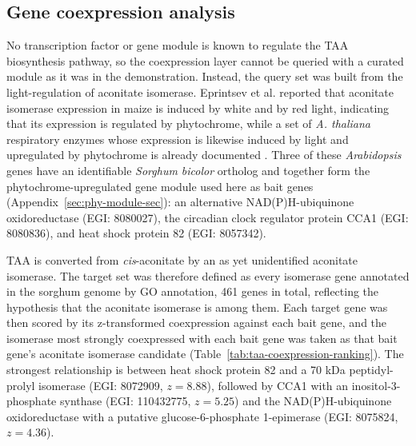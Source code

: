\subsection{Gene coexpression analysis}
\hspace{1em}No transcription factor or gene module is known to regulate the TAA biosynthesis pathway, so the coexpression layer cannot be queried with a curated module as it was in the demonstration. Instead, the query set was built from the light-regulation of aconitate isomerase. Eprintsev et al. \cite{eprintsevAconitateIsomeraseMaize2021} reported that aconitate isomerase expression in maize is induced by white and by red light, indicating that its expression is regulated by phytochrome, while a set of \textit{A. thaliana} respiratory enzymes whose expression is likewise induced by light and upregulated by phytochrome is already documented \cite{igamberdievMitochondriaPhotosyntheticCells2023}. Three of these \textit{Arabidopsis} genes have an identifiable \textit{Sorghum bicolor} ortholog and together form the phytochrome-upregulated gene module used here as bait genes (Appendix~\ref{sec:phy-module-sec}): an alternative NAD(P)H-ubiquinone oxidoreductase (EGI: 8080027), the circadian clock regulator protein CCA1 (EGI: 8080836), and heat shock protein 82 (EGI: 8057342).

\hspace{1em}TAA is converted from \textit{cis}-aconitate by an as yet unidentified aconitate isomerase. The target set was therefore defined as every isomerase gene annotated in the sorghum genome by GO annotation, 461 genes in total, reflecting the hypothesis that the aconitate isomerase is among them. Each target gene was then scored by its z-transformed coexpression against each bait gene, and the isomerase most strongly coexpressed with each bait gene was taken as that bait gene's aconitate isomerase candidate (Table~\ref{tab:taa-coexpression-ranking}). The strongest relationship is between heat shock protein 82 and a 70 kDa peptidyl-prolyl isomerase (EGI: 8072909, $z = 8.88$), followed by CCA1 with an inositol-3-phosphate synthase (EGI: 110432775, $z = 5.25$) and the NAD(P)H-ubiquinone oxidoreductase with a putative glucose-6-phosphate 1-epimerase (EGI: 8075824, $z = 4.36$).

